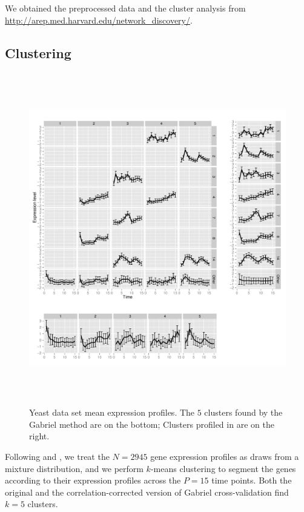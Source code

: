 \documentclass[12pt]{article}
\begin{document}
We obtained the preprocessed data and the \citet{tavazoie1999systematic}
cluster analysis from \url{http://arep.med.harvard.edu/network_discovery/}.


\subsection{Clustering}


\begin{figure}
		\centering
	\includegraphics[width=5.7in, height=5.7in]{wei/split_plots.pdf}
	\caption{Yeast data set mean expression profiles. The $5$ clusters found by
  the Gabriel method are on the bottom; Clusters profiled in
  \cite{tavazoie1999systematic} are on the right.}
	\label{fig:5_clusters}
\end{figure}	

Following \citet{tavazoie1999systematic} and \citet{dortet2008model}, we
treat the $N = 2945$ gene expression profiles as draws from a mixture
distribution, and we perform $k$-means clustering to segment the genes
according to their expression profiles across the $P = 15$ time points. 
Both the original and the correlation-corrected version of Gabriel
cross-validation find $k = 5$ clusters.
\end{document}
